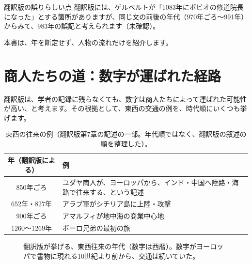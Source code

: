\documentclass[a4paper,11pt,openany]{ltjsbook}
\begin{document}
\begin{notebox}{翻訳版の誤りらしい点}
翻訳版には、ゲルベルトが「1083年にボビオの修道院長になった」とする箇所がありますが、同じ文の前後の年代（970年ごろ〜991年）からみて、983年の誤記と考えられます（未確認）。

本書は、年を断定せず、人物の流れだけを紹介します。
\end{notebox}

\section{商人たちの道：数字が運ばれた経路}

翻訳版は、学者の記録に残らなくても、数字は商人たちによって運ばれた可能性が高い、と考えます。その根拠として、東西の交通の例を、時代順にいくつも挙げます。

\begin{table}[htbp]
\centering
\begin{tabular}{cp{10cm}}
\toprule
年（翻訳版による） & 例\\
\midrule
850年ごろ & ユダヤ商人が、ヨーロッパから、インド・中国へ陸路・海路で往来する、という記述\\
652年・827年 & アラブ軍がシチリア島に上陸・攻撃\\
900年ごろ & アマルフィが地中海の商業中心地\\
1260〜1269年 & ポーロ兄弟の最初の旅\\
\bottomrule
\end{tabular}
\caption{東西の往来の例（翻訳版第7章の記述の一部。年代順ではなく、翻訳版の叙述の順を整理した）。}
\end{table}

\begin{figure}[htbp]
\centering
{}
\caption{翻訳版が挙げる、東西往来の年代（数字は西暦）。数字がヨーロッパで書物に現れる10世紀より前から、交通は続いていた。}
\end{figure}
\end{document}
